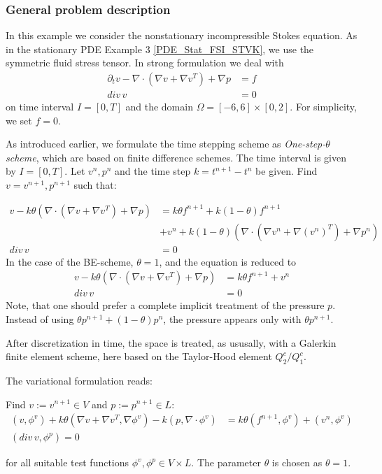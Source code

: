 \subsubsection{General problem description}
In this example we consider the nonstationary incompressible Stokes equation. As in the stationary PDE Example 3 \ref{PDE_Stat_FSI_STVK},
we use the symmetric fluid stress tensor.  
In strong formulation we deal with 
\begin{align*}
\partial_t v -\nabla\cdot (\nabla v + \nabla v^{T}) + \nabla p &= f \\
div\, v &= 0 
\end{align*}
on time interval $I=[0,T]$ and the domain 
$\Omega = [-6,6]\times [0,2]$. For simplicity,  we set $f=0$.

As introduced earlier, 
we formulate the time stepping scheme as \textit{One-step-$\theta$ scheme},
which are based on finite difference schemes. 
The time interval is given by $I=[0,T]$. Let $v^n,p^n$ and the time
step $k=t^{n+1}-t^n$ be given. Find $v=v^{n+1}, p^{n+1}$ such that:

\begin{align*}
v - k\theta (\nabla\cdot (\nabla v + \nabla v^{T}) + \nabla p) &=
k\theta f^{n+1} + k(1-\theta)f^{n+1}\\
&+  v^n + k(1-\theta) (\nabla\cdot (\nabla v^n + \nabla (v^n)^{T}) 
+ \nabla p^n) \\
div \,v &= 0 
\end{align*}
In the case of the BE-scheme, $\theta = 1$, and the equation is reduced to
\begin{align*}
v - k\theta (\nabla\cdot (\nabla v + \nabla v^{T}) + \nabla p) &=
k\theta f^{n+1} +  v^n  \\
div \,v &= 0
\end{align*}
Note, that one should prefer a complete implicit treatment of the
pressure $p$. Instead of using $\theta p^{n+1} + (1-\theta)p^n$, the pressure
appears only with $\theta p^{n+1}$.

After discretization in time, the space is treated, as ususally, with 
a Galerkin finite element scheme, here based on the Taylor-Hood element 
$Q_2^c / Q_1^c$.

The variational formulation reads:

\begin{Problem}
Find $v:= v^{n+1}\in V$ and $p:= p^{n+1}\in L$:
\begin{align*}
(v,\phi^v) + k\theta (\nabla v + \nabla v^{T}, \nabla\phi^v) 
- k  (p, \nabla\cdot\phi^v) &=
k\theta (f^{n+1},\phi^v) +  (v^n,\phi^v)\\
(div \,v,\phi^p) = 0  
\end{align*}
\end{Problem}
for all suitable test functions ${\phi^v , \phi^p} \in V\times L$. 
The parameter $\theta$ is chosen as $\theta =1$.

